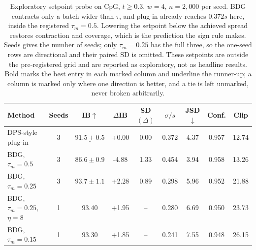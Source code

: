 \documentclass{article}
\begin{document}
\begin{table}[!htbp]
\centering\small\setlength{\tabcolsep}{4pt}
\caption{Exploratory setpoint probe on CpG, $t\ge0.3$, $w=4$, $n=2{,}000$ per seed. BDG contracts only a batch wider than $\tau$, and plug-in already reaches $0.372s$ here, inside the registered $\tau_m=0.5$. Lowering the setpoint below the achieved spread restores contraction and coverage, which is the prediction the sign rule makes. Seeds gives the number of seeds; only $\tau_m=0.25$ has the full three, so the one-seed rows are directional and their paired SD is omitted. These setpoints are outside the pre-registered grid and are reported as exploratory, not as headline results. Bold marks the best entry in each marked column and underline the runner-up; a column is marked only where one direction is better, and a tie is left unmarked, never broken arbitrarily.}
\label{tab:setpoint}
\begin{tabular}{lcccccccc}
\toprule
Method & Seeds & IB$\uparrow$ & $\Delta$IB & SD$(\Delta)$ & $\sigma/s$ & JSD$\downarrow$ & Conf. & Clip\\
\midrule
DPS-style plug-in & 3 & $\underline{91.5\pm0.5}$& +0.00 & 0.00 & 0.372 & 4.37 & 0.957 & 12.74\\
BDG, $\tau_m=0.5$ & 3 & $86.6\pm0.9$ & -4.88 & 1.33 & 0.454 & 3.94 & 0.958 & 13.26\\
BDG, $\tau_m=0.25$ & 3 & $\mathbf{93.7\pm1.1}$& +2.28 & 0.89 & 0.298 & 5.96 & 0.952 & 21.88\\
BDG, $\tau_m=0.25$, $\eta=8$ & 1 & $93.40$ & +1.95 & -- & 0.280 & 6.69 & 0.950 & 23.73\\
BDG, $\tau_m=0.15$ & 1 & $93.30$ & +1.85 & -- & 0.241 & 7.55 & 0.948 & 26.15\\
\bottomrule
\end{tabular}
\end{table}
\end{document}
